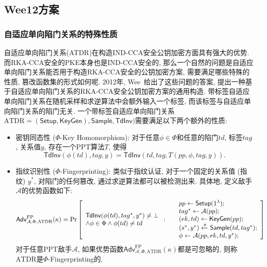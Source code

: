 \subsection{Wee12方案}
\subsubsection{自适应单向陷门关系的特殊性质}
自适应单向陷门关系(ATDR)在构造IND-CCA安全公钥加密方面具有强大的优势. 而RKA-CCA安全的PKE本身也是IND-CCA安全的, 那么一个自然的问题是自适应单向陷门关系能否用于构造RKA-CCA安全的公钥加密方案, 需要满足哪些特殊的性质, 篡改函数集的形式如何呢. 2012年, Wee~\cite{Wee-EUROCRYPT-2012}给出了这些问题的答案, 提出一种基于自适应单向陷门关系的RKA-CCA安全公钥加密方案的通用构造. 带标签自适应单向陷门关系在随机采样和求逆算法中会额外输入一个标签, 而该标签与自适应单向陷门关系的陷门无关. 一个带标签自适应单向陷门关系$\text{ATDR} = (\mathsf{Setup}, \mathsf{KeyGen}), \mathsf{Sample}, \mathsf{TdInv})$需要满足以下两个额外的性质:
\begin{itemize}
\item 密钥同态性 ($\Phi$-Key Homomorphism): 对于任意$\phi \in \Phi$和任意的陷门$td$, 标签$tag$, 关系值$y$, 存在一个PPT算法$T$, 使得
\[
\mathsf{TdInv}(\phi(td), tag, y) = \mathsf{TdInv}(td, tag, T(pp, \phi, tag, y)).
\]

\item 指纹识别性 ($\Phi$-Fingerprinting): 类似于指纹认证, 对于一个固定的关系值 (指纹) $y^*$, 对陷门的任何篡改, 通过求逆算法都可以被检测出来. 具体地, 定义敌手$\mathcal{A}$的优势函数如下:
\begin{displaymath}
	\mathsf{Adv}_{\mathcal{A}, \Phi, \text{ATDR}}^{\text{FP}}(\kappa) = \Pr \left[ 
\begin{array}{l}
\mathsf{TdInv}(\phi(td), tag^*, y^*) \neq \bot\\
\land \phi \in \Phi \land \phi(td) \neq td
\end{array}
:~
	\begin{array}{ll}
		& pp \leftarrow \mathsf{Setup}(1^\lambda); \\
		& tag^* \leftarrow \mathcal{A}(pp); \\
		& (ek, td) \leftarrow \mathsf{KeyGen}(pp);\\
		& (s^*, y^*) \xleftarrow{\textup{\tiny R}} \mathsf{Sample}(td, tag^*); \\
		& \phi \leftarrow \mathcal{A}(pp, ek, td, y^*);
	\end{array} 
\right]
\end{displaymath}
对于任意PPT敌手$\mathcal{A}$, 如果优势函数$\mathsf{Adv}_{\mathcal{A}, \Phi, \text{ATDR}}^{\text{FP}}(\kappa)$都是可忽略的, 则称$\text{ATDR}$是$\Phi$-Fingerprinting的.
\end{itemize}

